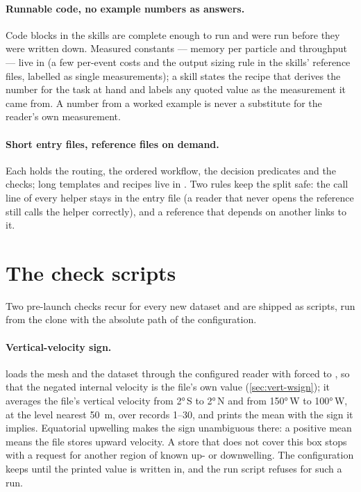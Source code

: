 \paragraph{Runnable code, no example numbers as answers.} Code blocks in the skills are complete
enough to run and were run before they were written down. Measured constants --- memory per particle and
throughput --- live in  (a few per-event costs and the output sizing rule in
the skills' reference files, labelled as single measurements); a skill states the recipe that
derives the number for the task at hand and labels any quoted value as the measurement it came from.
A number from a worked example is never a substitute for the reader's own measurement.

\paragraph{Short entry files, reference files on demand.} Each  holds the routing,
the ordered workflow, the decision predicates and the checks; long templates and recipes live in
. Two rules keep the split safe: the call line of every helper stays in the entry
file (a reader that never opens the reference still calls the helper correctly), and a reference that
depends on another links to it.

\section{The check scripts}\label{sec:skills-scripts}

Two pre-launch checks recur for every new dataset and are shipped as scripts, run from the clone
with the absolute path of the configuration.

\paragraph{Vertical-velocity sign.}  loads the mesh and the dataset through the
configured reader with  forced to , so that the negated internal
velocity is the file's own value (\cref{sec:vert-wsign}); it averages the file's vertical velocity
from \ang{2}\,S to \ang{2}\,N and from \ang{150}\,W to \ang{100}\,W, at the level nearest \SI{50}{m}, over records 1--30, and prints the mean with the sign
it implies. Equatorial upwelling makes the sign unambiguous there: a positive mean means the file
stores upward velocity. A store that does not cover this box stops with a request for another region
of known up- or downwelling. The configuration keeps  until the printed value
is written in, and the run script refuses  for such a run.

